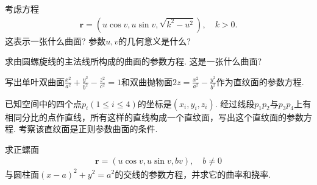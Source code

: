 \documentclass[../../main.tex]{subfiles}%
\begin{document}
\begin{example}
考虑方程
\begin{align*}
\bm{r} = (u \cos v, u \sin v, \sqrt{k^2 - u^2}), \quad k > 0.
\end{align*}
这表示一张什么曲面? 参数$u,v$的几何意义是什么?
\end{example}
\begin{solution}



\end{solution}

\begin{example}
求由圆螺旋线的主法线所构成的曲面的参数方程. 这是一张什么曲面?
\end{example}
\begin{solution}



\end{solution}

\begin{example}
写出单叶双曲面$\frac{x^2}{a^2} + \frac{y^2}{b^2} - \frac{z^2}{c^2} = 1$和双曲抛物面$2z = \frac{x^2}{a^2} - \frac{y^2}{b^2}$作为直纹面的参数方程.
\end{example}
\begin{solution}



\end{solution}

\begin{example}
已知空间中的四个点$p_i(1 \leqslant i \leqslant 4)$的坐标是$(x_i,y_i,z_i)$. 经过线段$p_1p_2$与$p_3p_4$上有相同分比的点作直线，所有这样的直线构成一个直纹面，写出这个直纹面的参数方程. 考察该直纹面是正则参数曲面的条件.
\end{example}
\begin{solution}



\end{solution}

\begin{example}
求正螺面
\begin{align*}
\bm{r} = (u \cos v, u \sin v, bv), \quad b \neq 0
\end{align*}
与圆柱面$(x - a)^2 + y^2 = a^2$的交线的参数方程，并求它的曲率和挠率.
\end{example}
\begin{solution}



\end{solution}
\end{document}
